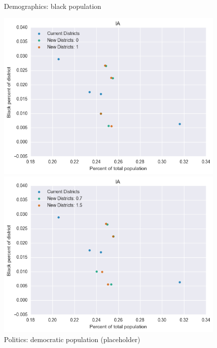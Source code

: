 \begin{figure}[htb!] \centering
\caption{ Demographics: black population }
\includegraphics[width=4.5in]{../analysis/IA/analysis_scatter.png}
\caption{ Politics: democratic population (placeholder)}
\includegraphics[width=4.5in]{../analysis/IA/analysis_scatter2.png}
\end{figure}

\clearpage
\newpage

